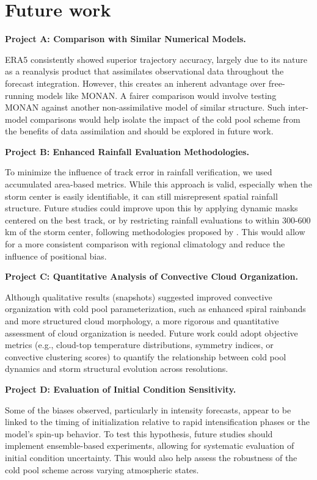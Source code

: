 \section{Future work}

\textbf{Project A: Comparison with Similar Numerical Models.}

ERA5 consistently showed superior trajectory accuracy, largely due to its nature as a reanalysis product that assimilates observational data throughout the forecast integration. However, this creates an inherent advantage over free-running models like MONAN. A fairer comparison would involve testing MONAN against another non-assimilative model of similar structure. Such inter-model comparisons would help isolate the impact of the cold pool scheme from the benefits of data assimilation and should be explored in future work.

\textbf{Project B: Enhanced Rainfall Evaluation Methodologies.}

To minimize the influence of track error in rainfall verification, we used accumulated area-based metrics. While this approach is valid, especially when the storm center is easily identifiable, it can still misrepresent spatial rainfall structure. Future studies could improve upon this by applying dynamic masks centered on the best track, or by restricting rainfall evaluations to within 300-600 km of the storm center, following methodologies proposed by . This would allow for a more consistent comparison with regional climatology and reduce the influence of positional bias.

\textbf{Project C: Quantitative Analysis of Convective Cloud Organization.
}

Although qualitative results (snapshots) suggested improved convective organization with cold pool parameterization, such as enhanced spiral rainbands and more structured cloud morphology, a more rigorous and quantitative assessment of cloud organization is needed. Future work could adopt objective metrics (e.g., cloud-top temperature distributions, symmetry indices, or convective clustering scores) to quantify the relationship between cold pool dynamics and storm structural evolution across resolutions.

\textbf{Project D: Evaluation of Initial Condition Sensitivity.}

Some of the biases observed, particularly in intensity forecasts, appear to be linked to the timing of initialization relative to rapid intensification phases or the model’s spin-up behavior. To test this hypothesis, future studies should implement ensemble-based experiments, allowing for systematic evaluation of initial condition uncertainty. This would also help assess the robustness of the cold pool scheme across varying atmospheric states.

